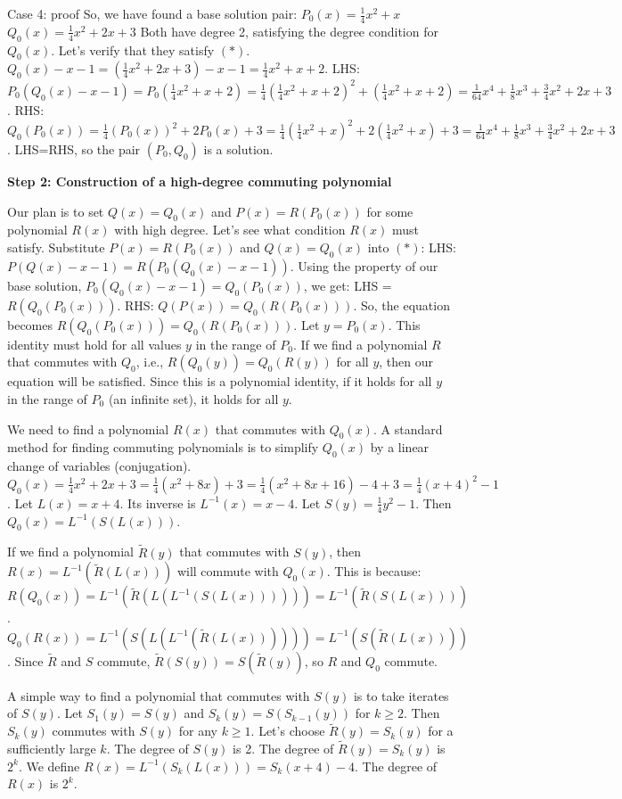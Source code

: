 \documentclass{article} %
\begin{document}
\begin{promptbox}{Case 4: proof}
So, we have found a base solution pair:
$P_0(x) = \frac{1}{4}x^2+x$
$Q_0(x) = \frac{1}{4}x^2+2x+3$
Both have degree 2, satisfying the degree condition for $Q_0(x)$. Let's verify that they satisfy $(*)$.
$Q_0(x)-x-1 = (\frac{1}{4}x^2+2x+3)-x-1 = \frac{1}{4}x^2+x+2$.
LHS: $P_0(Q_0(x)-x-1) = P_0(\frac{1}{4}x^2+x+2) = \frac{1}{4}(\frac{1}{4}x^2+x+2)^2 + (\frac{1}{4}x^2+x+2) = \frac{1}{64}x^4+\frac{1}{8}x^3+\frac{3}{4}x^2+2x+3$.
RHS: $Q_0(P_0(x)) = \frac{1}{4}(P_0(x))^2+2P_0(x)+3 = \frac{1}{4}(\frac{1}{4}x^2+x)^2 + 2(\frac{1}{4}x^2+x)+3 = \frac{1}{64}x^4+\frac{1}{8}x^3+\frac{3}{4}x^2+2x+3$.
LHS=RHS, so the pair $(P_0, Q_0)$ is a solution.

\textbf{Step 2: Construction of a high-degree commuting polynomial}

Our plan is to set $Q(x) = Q_0(x)$ and $P(x) = R(P_0(x))$ for some polynomial $R(x)$ with high degree. Let's see what condition $R(x)$ must satisfy.
Substitute $P(x)=R(P_0(x))$ and $Q(x)=Q_0(x)$ into $(*)$:
LHS: $P(Q(x)-x-1) = R(P_0(Q_0(x)-x-1))$.
Using the property of our base solution, $P_0(Q_0(x)-x-1)=Q_0(P_0(x))$, we get:
LHS = $R(Q_0(P_0(x)))$.
RHS: $Q(P(x)) = Q_0(R(P_0(x)))$.
So, the equation becomes $R(Q_0(P_0(x))) = Q_0(R(P_0(x)))$.
Let $y=P_0(x)$. This identity must hold for all values $y$ in the range of $P_0$. If we find a polynomial $R$ that commutes with $Q_0$, i.e., $R(Q_0(y)) = Q_0(R(y))$ for all $y$, then our equation will be satisfied. Since this is a polynomial identity, if it holds for all $y$ in the range of $P_0$ (an infinite set), it holds for all $y$.

We need to find a polynomial $R(x)$ that commutes with $Q_0(x)$. A standard method for finding commuting polynomials is to simplify $Q_0(x)$ by a linear change of variables (conjugation).
$Q_0(x) = \frac{1}{4}x^2+2x+3 = \frac{1}{4}(x^2+8x) + 3 = \frac{1}{4}(x^2+8x+16) - 4+3 = \frac{1}{4}(x+4)^2 - 1$.
Let $L(x) = x+4$. Its inverse is $L^{-1}(x) = x-4$.
Let $S(y) = \frac{1}{4}y^2-1$.
Then $Q_0(x) = L^{-1}(S(L(x)))$.

If we find a polynomial $\tilde{R}(y)$ that commutes with $S(y)$, then $R(x) = L^{-1}(\tilde{R}(L(x)))$ will commute with $Q_0(x)$. This is because:
$R(Q_0(x)) = L^{-1}(\tilde{R}(L(L^{-1}(S(L(x)))))) = L^{-1}(\tilde{R}(S(L(x))))$.
$Q_0(R(x)) = L^{-1}(S(L(L^{-1}(\tilde{R}(L(x)))))) = L^{-1}(S(\tilde{R}(L(x))))$.
Since $\tilde{R}$ and $S$ commute, $\tilde{R}(S(y))=S(\tilde{R}(y))$, so $R$ and $Q_0$ commute.

A simple way to find a polynomial that commutes with $S(y)$ is to take iterates of $S(y)$. Let $S_1(y) = S(y)$ and $S_k(y) = S(S_{k-1}(y))$ for $k \ge 2$. Then $S_k(y)$ commutes with $S(y)$ for any $k \ge 1$.
Let's choose $\tilde{R}(y) = S_k(y)$ for a sufficiently large $k$.
The degree of $S(y)$ is 2. The degree of $\tilde{R}(y)=S_k(y)$ is $2^k$.
We define $R(x) = L^{-1}(S_k(L(x))) = S_k(x+4)-4$. The degree of $R(x)$ is $2^k$.


\end{promptbox}
\end{document}
